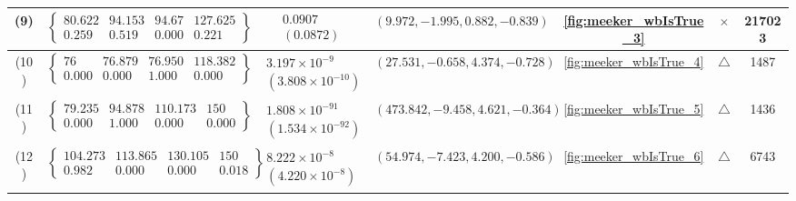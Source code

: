 \begin{table}[H]
\begin{adjustwidth}{-2.5cm}{-2.5cm}
{\begin{tabular}{|c|c|c|c|c|c|c|}
\hline
(9) & $\left\{\begin{array}{cccc}
80.622 & 94.153 & 94.67 & 127.625 \\
0.259 & 0.519 & 0.000 & 0.221
\end{array}\right\}$ &
$\begin{array}{c}
0.0907 \\
(0.0872)
\end{array}$ & 
$(9.972, -1.995, 0.882, -0.839)$ & 
\ref{fig:meeker_wbIsTrue_3} & $\times$ & 217023 \\
\hline
(10) & $\left\{\begin{array}{cccc}
76 & 76.879 & 76.950 & 118.382 \\
0.000 & 0.000 & 1.000 & 0.000
\end{array}\right\}$ &
$\begin{array}{c}
3.197\times 10^{-9} \\
(3.808\times 10^{-10})
\end{array}$ & 
$(27.531, -0.658, 4.374, -0.728)$ & 
\ref{fig:meeker_wbIsTrue_4} & $\triangle$ & 1487 \\
\hline
(11) & $\left\{\begin{array}{cccc}
79.235 & 94.878 & 110.173 & 150 \\
0.000 & 1.000 & 0.000 & 0.000
\end{array}\right\}$ &
$\begin{array}{c}
1.808\times 10^{-91} \\
(1.534\times 10^{-92})
\end{array}$ & 
$(473.842, -9.458, 4.621, -0.364)$ & 
\ref{fig:meeker_wbIsTrue_5} & $\triangle$ & 1436 \\
\hline
(12) & $\left\{\begin{array}{cccc}
104.273 & 113.865 & 130.105 & 150 \\
0.982 & 0.000 & 0.000 & 0.018
\end{array}\right\}$ &
$\begin{array}{c}
8.222\times 10^{-8} \\
(4.220\times 10^{-8})
\end{array}$ & 
$(54.974, -7.423, 4.200, -0.586)$ & 
\ref{fig:meeker_wbIsTrue_6} & $\triangle$ & 6743 \\
\hline
\end{tabular}
}
\end{adjustwidth}
\end{table}